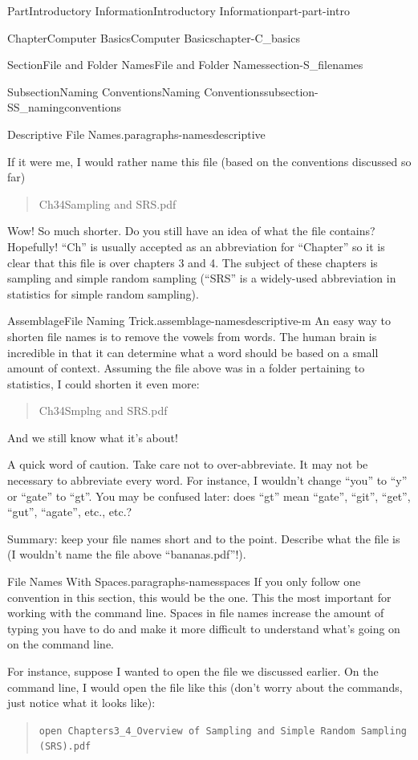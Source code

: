 \documentclass[oneside,10pt,]{book}
\newcommand{\mono}[1]{\texttt{#1}}
\begin{document}
\begin{partptx}{Part}{Introductory Information}{}{Introductory Information}{}{}{part-part-intro}
\begin{chapterptx}{Chapter}{Computer Basics}{}{Computer Basics}{}{}{chapter-C_basics}
\begin{sectionptx}{Section}{File and Folder Names}{}{File and Folder Names}{}{}{section-S_filenames}
\begin{subsectionptx}{Subsection}{Naming Conventions}{}{Naming Conventions}{}{}{subsection-SS_namingconventions}
\begin{paragraphs}{Descriptive File Names.}{paragraphs-namesdescriptive}
\par
If it were me, I would rather name this file (based on the conventions discussed so far)%
\begin{quote}%
Ch3\textunderscore{}4\textunderscore{}Sampling and SRS.pdf%
\end{quote}
Wow! So much shorter. Do you still have an idea of what the file contains? Hopefully! ``Ch'' is usually accepted as an abbreviation for ``Chapter'' so it is clear that this file is over chapters 3 and 4. The subject of these chapters is sampling and simple random sampling (``SRS'' is a widely-used abbreviation in statistics for simple random sampling).%
\begin{assemblage}{Assemblage}{File Naming Trick.}{assemblage-namesdescriptive-m}%
An easy way to shorten file names is to remove the vowels from words. The human brain is incredible in that it can determine what a word should be based on a small amount of context. Assuming the file above was in a folder pertaining to statistics, I could shorten it even more:%
\begin{quote}%
Ch3\textunderscore{}4\textunderscore{}Smplng and SRS.pdf%
\end{quote}
And we still know what it's about!%
\par
A quick word of caution. Take care not to over-abbreviate. It may not be necessary to abbreviate every word. For instance, I wouldn't change ``you'' to ``y'' or ``gate'' to ``gt''. You may be confused later: does ``gt'' mean ``gate'', ``git'', ``get'', ``gut'', ``agate'', etc., etc.?%
\end{assemblage}
Summary: keep your file names short and to the point. Describe what the file is (I wouldn't name the file above ``bananas.pdf''!).%
\end{paragraphs}%
\begin{paragraphs}{File Names With Spaces.}{paragraphs-namesspaces}%
%
If you only follow one convention in this section, this would be the one. This the most important for working with the command line. Spaces in file names increase the amount of typing you have to do and make it more difficult to understand what's going on on the command line.%
\par
For instance, suppose I wanted to open the file we discussed earlier. On the command line, I would open the file like this (don't worry about the commands, just notice what it looks like):%
\begin{quote}%
\mono{open \textquotesingle{}Chapters3\_4\_Overview of Sampling and Simple Random Sampling (SRS).pdf\textquotesingle{}}%

\end{quote}
\end{paragraphs}
\end{subsectionptx}
\end{sectionptx}
\end{chapterptx}
\end{partptx}
\end{document}
